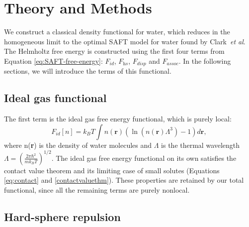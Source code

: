 \documentclass[twocolumn,amsmath,amssymb,prl]{revtex4-1}
\newcommand{\xx}{\textbf{r}}
\begin{document}
\section{Theory and Methods}
We construct a classical density functional for water, which reduces
in the homogeneous limit to the optimal SAFT model for water found by
Clark~\emph{et al}.  The Helmholtz free energy is constructed using the
first four terms from Equation \ref{eq:SAFT-free-energy}: $F_\textit{id}$,
$F_\textit{hs}$, $F_\textit{disp}$ and $F_\textit{assoc}$.  In the
following sections, we will introduce the terms of this functional.

\subsection{Ideal gas functional}
The first term is the ideal gas free energy functional, which is
purely local:
\begin{equation}\label{idealgas}
  F_{id}[n] = k_B T \int n(\xx)\left( \ln({n(\xx){\Lambda}^3}) - 1\right) d\xx,
\end{equation}
where n(\xx) is the density of water molecules and $\Lambda$ is the
thermal wavelength
$ \Lambda = \left(\frac{2\pi\hbar^2}{mk_BT}\right )^{1/2}$.
The ideal gas free energy functional on its own satisfies the contact
value theorem and its limiting case of small solutes (Equations
\ref{eq:contact} and \ref{contactvaluethm}). These properties are
retained by our total functional, since all the remaining terms are
purely nonlocal.

\subsection{Hard-sphere repulsion}
\end{document}

